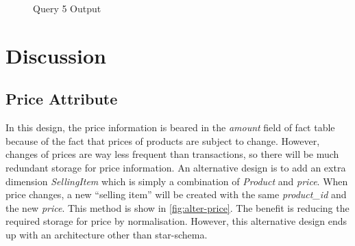 \documentclass[
  a4paper,
]{article}
\begin{document}
\begin{figure}
    \centering
    \caption{Query 5 Output\label{fig:q5-output}}
\end{figure}

\renewcommand*{\thesubsection}{\oldsubsection}

\hypertarget{discussion}{%
\section{Discussion}\label{discussion}}

\hypertarget{price-attribute}{%
\subsection{Price Attribute}\label{price-attribute}}

In this design, the price information is beared in the \emph{amount}
field of fact table because of the fact that prices of products are
subject to change. However, changes of prices are way less frequent than
transactions, so there will be much redundant storage for price
information. An alternative design is to add an extra dimension
\emph{SellingItem} which is simply a combination of \emph{Product} and
\emph{price}. When price changes, a new ``selling item'' will be created
with the same \emph{product\_id} and the new \emph{price}. This method
is show in \cref{fig:alter-price}. The benefit is reducing the required
storage for price by normalisation. However, this alternative design
ends up with an architecture other than star-schema.
\end{document}
